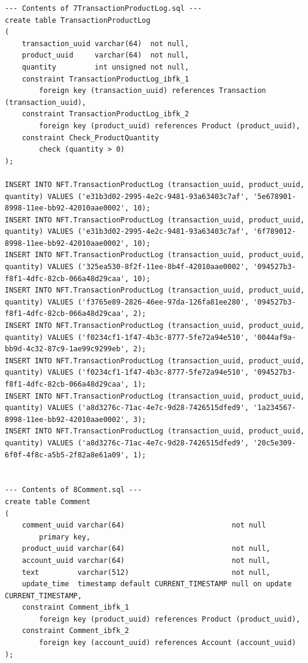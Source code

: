 \documentclass[a4paper, 12pt]{article}
\begin{document}
\begin{lstlisting}
--- Contents of 7TransactionProductLog.sql ---
create table TransactionProductLog
(
    transaction_uuid varchar(64)  not null,
    product_uuid     varchar(64)  not null,
    quantity         int unsigned not null,
    constraint TransactionProductLog_ibfk_1
        foreign key (transaction_uuid) references Transaction (transaction_uuid),
    constraint TransactionProductLog_ibfk_2
        foreign key (product_uuid) references Product (product_uuid),
    constraint Check_ProductQuantity
        check (quantity > 0)
);

INSERT INTO NFT.TransactionProductLog (transaction_uuid, product_uuid, quantity) VALUES ('e31b3d02-2995-4e2c-9481-93a63403c7af', '5e678901-8998-11ee-bb92-42010aae0002', 10);
INSERT INTO NFT.TransactionProductLog (transaction_uuid, product_uuid, quantity) VALUES ('e31b3d02-2995-4e2c-9481-93a63403c7af', '6f789012-8998-11ee-bb92-42010aae0002', 10);
INSERT INTO NFT.TransactionProductLog (transaction_uuid, product_uuid, quantity) VALUES ('325ea530-8f2f-11ee-8b4f-42010aae0002', '094527b3-f8f1-4dfc-82cb-066a48d29caa', 10);
INSERT INTO NFT.TransactionProductLog (transaction_uuid, product_uuid, quantity) VALUES ('f3765e89-2826-46ee-97da-126fa81ee280', '094527b3-f8f1-4dfc-82cb-066a48d29caa', 2);
INSERT INTO NFT.TransactionProductLog (transaction_uuid, product_uuid, quantity) VALUES ('f0234cf1-1f47-4b3c-8777-5fe72a94e510', '0044af9a-bb9d-4c32-87c9-1ae99c9299eb', 2);
INSERT INTO NFT.TransactionProductLog (transaction_uuid, product_uuid, quantity) VALUES ('f0234cf1-1f47-4b3c-8777-5fe72a94e510', '094527b3-f8f1-4dfc-82cb-066a48d29caa', 1);
INSERT INTO NFT.TransactionProductLog (transaction_uuid, product_uuid, quantity) VALUES ('a8d3276c-71ac-4e7c-9d28-7426515dfed9', '1a234567-8998-11ee-bb92-42010aae0002', 3);
INSERT INTO NFT.TransactionProductLog (transaction_uuid, product_uuid, quantity) VALUES ('a8d3276c-71ac-4e7c-9d28-7426515dfed9', '20c5e309-6f0f-4f8c-a5b5-2f82a8e61a09', 1);


--- Contents of 8Comment.sql ---
create table Comment
(
    comment_uuid varchar(64)                         not null
        primary key,
    product_uuid varchar(64)                         not null,
    account_uuid varchar(64)                         not null,
    text         varchar(512)                        not null,
    update_time  timestamp default CURRENT_TIMESTAMP null on update CURRENT_TIMESTAMP,
    constraint Comment_ibfk_1
        foreign key (product_uuid) references Product (product_uuid),
    constraint Comment_ibfk_2
        foreign key (account_uuid) references Account (account_uuid)
);


\end{lstlisting}
\end{document}
